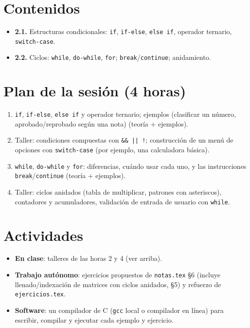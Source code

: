 \documentclass[11pt,letterpaper]{article}
\begin{document}
\section{Contenidos}

\begin{itemize}[leftmargin=1.2cm]
  \item \textbf{2.1.} Estructuras condicionales: \texttt{if}, \texttt{if-else}, \texttt{else if},
        operador ternario, \texttt{switch-case}.
  \item \textbf{2.2.} Ciclos: \texttt{while}, \texttt{do-while}, \texttt{for};
        \texttt{break}/\texttt{continue}; anidamiento.
\end{itemize}

\section{Plan de la sesión (4 horas)}

\begin{enumerate}[leftmargin=1.2cm]
  \item[\textbf{Hora 1.}] \texttt{if}, \texttt{if-else}, \texttt{else if} y operador ternario;
        ejemplos (clasificar un número, aprobado/reprobado según una nota) (teoría + ejemplos).
  \item[\textbf{Hora 2.}] Taller: condiciones compuestas con \texttt{\&\& || !}; construcción de un
        menú de opciones con \texttt{switch-case} (por ejemplo, una calculadora básica).
  \item[\textbf{Hora 3.}] \texttt{while}, \texttt{do-while} y \texttt{for}: diferencias, cuándo usar
        cada uno, y las instrucciones \texttt{break}/\texttt{continue} (teoría + ejemplos).
  \item[\textbf{Hora 4.}] Taller: ciclos anidados (tabla de multiplicar, patrones con asteriscos),
        contadores y acumuladores, validación de entrada de usuario con \texttt{while}.
\end{enumerate}

\section{Actividades}

\begin{itemize}[leftmargin=1.2cm]
  \item \textbf{En clase}: talleres de las horas 2 y 4 (ver arriba).
  \item \textbf{Trabajo autónomo}: ejercicios propuestos de \texttt{notas.tex} §6 (incluye
        llenado/indexación de matrices con ciclos anidados, §5) y refuerzo de
        \texttt{ejercicios.tex}.
  \item \textbf{Software}: un compilador de C (\texttt{gcc} local o compilador en línea) para
        escribir, compilar y ejecutar cada ejemplo y ejercicio.
\end{itemize}
\end{document}
